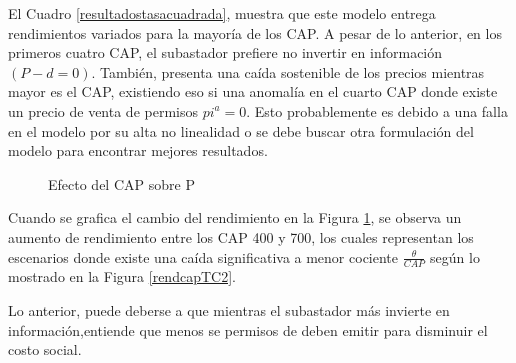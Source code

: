 El Cuadro \ref{resultadostasacuadrada}, muestra que este modelo entrega rendimientos variados para la mayoría de los CAP. A pesar de lo anterior, en los primeros cuatro CAP, el subastador prefiere no invertir en información $(P-d=0)$. También, presenta una caída sostenible de los precios mientras mayor es el CAP, existiendo eso si una anomalía en el cuarto CAP donde existe un precio de venta de permisos $pi^a=0$. Esto probablemente es debido a una falla en el modelo por su alta no linealidad o se debe buscar otra formulación del modelo para encontrar mejores resultados.
\vspace{2.5mm}

\begin{figure}[H]
\centering
{}
\caption{{\footnotesize Efecto del CAP sobre P}}
\label{rendcapTC}
\end{figure}

Cuando se grafica el cambio del rendimiento en la Figura \ref{rendcapTC}, se observa un aumento de rendimiento entre los CAP 400 y 700, los cuales representan los escenarios donde existe una caída significativa a menor cociente $\frac{\theta}{CAP}$ según lo mostrado en la Figura \ref{rendcapTC2}.
\vspace{2.5mm}

Lo anterior, puede deberse a que mientras el subastador más invierte en información,entiende que menos se permisos de deben emitir para disminuir el costo social.
\vspace{2.5mm}

